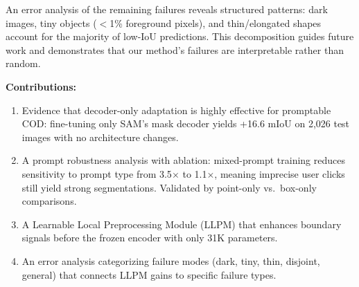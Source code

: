 An error analysis of the remaining failures reveals structured patterns: dark images, tiny objects ($<$1\% foreground pixels), and thin/elongated shapes account for the majority of low-IoU predictions. This decomposition guides future work and demonstrates that our method's failures are interpretable rather than random.

\noindent\textbf{Contributions:}
\begin{enumerate}
    \item Evidence that decoder-only adaptation is highly effective for promptable COD: fine-tuning only SAM's mask decoder yields +16.6 mIoU on 2,026 test images with no architecture changes.
    \item A prompt robustness analysis with ablation: mixed-prompt training reduces sensitivity to prompt type from 3.5$\times$ to 1.1$\times$, meaning imprecise user clicks still yield strong segmentations. Validated by point-only vs.\ box-only comparisons.
    \item A Learnable Local Preprocessing Module (LLPM) that enhances boundary signals before the frozen encoder with only 31K parameters.
    \item An error analysis categorizing failure modes (dark, tiny, thin, disjoint, general) that connects LLPM gains to specific failure types.
\end{enumerate}
